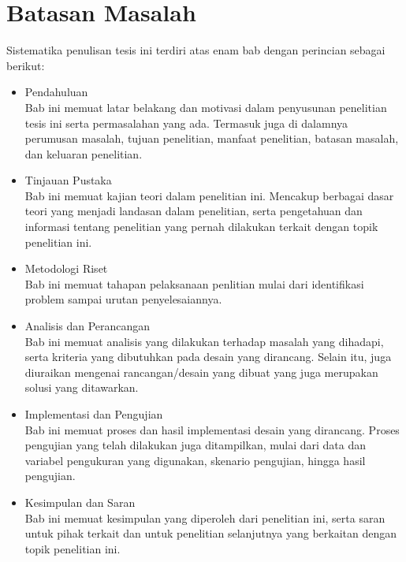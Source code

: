\section{Batasan Masalah}

Sistematika penulisan tesis ini terdiri atas enam bab dengan perincian sebagai berikut:

\begin{itemize}
\item Pendahuluan\\
Bab ini memuat latar belakang dan motivasi dalam penyusunan penelitian tesis ini serta permasalahan yang ada. Termasuk juga di dalamnya perumusan masalah, tujuan penelitian, manfaat penelitian, batasan masalah, dan keluaran penelitian.

\item Tinjauan Pustaka\\
Bab ini memuat kajian teori dalam penelitian ini. Mencakup berbagai dasar teori yang menjadi landasan dalam penelitian, serta pengetahuan dan informasi tentang penelitian yang pernah dilakukan terkait dengan topik penelitian ini.

\item Metodologi Riset\\
Bab ini memuat tahapan pelaksanaan penlitian mulai dari identifikasi problem sampai urutan penyelesaiannya.

\item Analisis dan Perancangan\\
Bab ini memuat analisis yang dilakukan terhadap masalah yang dihadapi, serta kriteria yang dibutuhkan pada desain yang dirancang. Selain itu, juga diuraikan mengenai rancangan/desain yang dibuat yang juga merupakan solusi yang ditawarkan.

\item Implementasi dan Pengujian\\
Bab ini memuat proses dan hasil implementasi desain yang dirancang. Proses pengujian yang telah dilakukan juga ditampilkan, mulai dari data dan variabel pengukuran yang digunakan, skenario pengujian, hingga hasil pengujian.

\item Kesimpulan dan Saran\\
Bab ini memuat kesimpulan yang diperoleh dari penelitian ini, serta saran untuk pihak terkait dan untuk penelitian selanjutnya yang berkaitan dengan topik penelitian ini.
\end{itemize}

